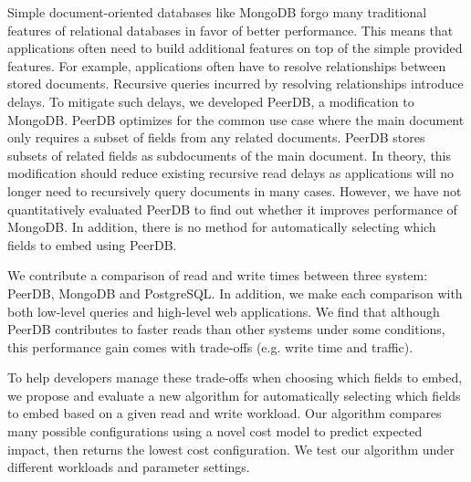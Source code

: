 Simple document-oriented databases like MongoDB forgo many traditional features of relational databases in favor of better performance. 
This means that applications often need to build additional features on top of the simple provided features. 
For example, applications often have to resolve relationships between stored documents. 
Recursive queries incurred by resolving relationships introduce delays. 
To mitigate such delays, we developed PeerDB, a modification to MongoDB. 
PeerDB optimizes for the common use case where the main document only requires a subset of fields from any related documents. 
PeerDB stores subsets of related fields as subdocuments of the main document. 
In theory, this modification should reduce existing recursive read delays as applications will no longer need to recursively query documents in many cases. 
However, we have not quantitatively evaluated PeerDB to find out whether it improves performance of MongoDB. In addition, there is no method for automatically selecting which fields to embed using PeerDB.

We contribute a comparison of read and write times between three system: PeerDB, MongoDB and PostgreSQL. 
In addition, we make each comparison with both low-level queries and high-level web applications. 
We find that although PeerDB contributes to faster reads than other systems under some conditions, this performance gain comes with trade-offs (e.g. write time and traffic). 

To help developers manage these trade-offs when choosing which fields to embed, we propose and evaluate a new algorithm for automatically selecting which fields to embed based on a given read and write workload. 
Our algorithm compares many possible configurations using a novel cost model to predict expected impact, then returns the lowest cost configuration.
We test our algorithm under different workloads and parameter settings.